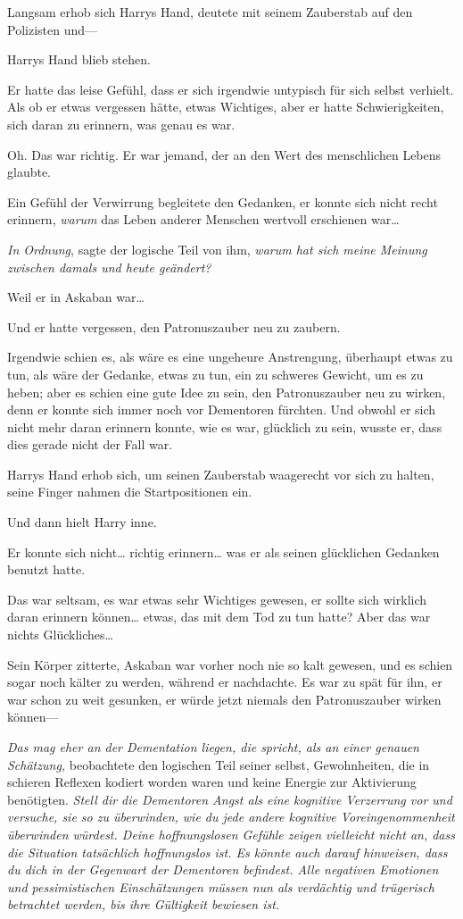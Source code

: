 {Langsam erhob sich Harrys Hand, deutete mit seinem Zauberstab auf den Polizisten und—

Harrys Hand blieb stehen.

Er hatte das leise Gefühl, dass er sich irgendwie untypisch für sich selbst verhielt. Als ob er etwas vergessen hätte, etwas Wichtiges, aber er hatte Schwierigkeiten, sich daran zu erinnern, was genau es war.

Oh. Das war richtig. Er war jemand, der an den Wert des menschlichen Lebens glaubte.

Ein Gefühl der Verwirrung begleitete den Gedanken, er konnte sich nicht recht erinnern, \emph{warum} das Leben anderer Menschen wertvoll erschienen war…

\emph{In Ordnung}, sagte der logische Teil von ihm, \emph{warum hat sich meine Meinung zwischen damals und heute geändert?}

Weil er in Askaban war…

Und er hatte vergessen, den Patronuszauber neu zu zaubern.

Irgendwie schien es, als wäre es eine ungeheure Anstrengung, überhaupt etwas zu tun, als wäre der Gedanke, etwas zu tun, ein zu schweres Gewicht, um es zu heben; aber es schien eine gute Idee zu sein, den Patronuszauber neu zu wirken, denn er konnte sich immer noch vor Dementoren fürchten. Und obwohl er sich nicht mehr daran erinnern konnte, wie es war, glücklich zu sein, wusste er, dass dies gerade nicht der Fall war.

Harrys Hand erhob sich, um seinen Zauberstab waagerecht vor sich zu halten, seine Finger nahmen die Startpositionen ein.

Und dann hielt Harry inne.

Er konnte sich nicht… richtig erinnern… was er als seinen glücklichen Gedanken benutzt hatte.

Das war seltsam, es war etwas sehr Wichtiges gewesen, er sollte sich wirklich daran erinnern können… etwas, das mit dem Tod zu tun hatte? Aber das war nichts Glückliches…

Sein Körper zitterte, Askaban war vorher noch nie so kalt gewesen, und es schien sogar noch kälter zu werden, während er nachdachte. Es war zu spät für ihn, er war schon zu weit gesunken, er würde jetzt niemals den Patronuszauber wirken können—

\emph{Das mag eher an der Dementation liegen, die spricht, als an einer genauen Schätzung,} beobachtete den logischen Teil seiner selbst, Gewohnheiten, die in schieren Reflexen kodiert worden waren und keine Energie zur Aktivierung benötigten. \emph{Stell dir die Dementoren Angst als eine kognitive Verzerrung vor und versuche, sie so zu überwinden, wie du jede andere kognitive Voreingenommenheit überwinden würdest. Deine hoffnungslosen Gefühle zeigen vielleicht nicht an, dass die Situation tatsächlich hoffnungslos ist. Es könnte auch darauf hinweisen, dass du dich in der Gegenwart der Dementoren befindest. Alle negativen Emotionen und pessimistischen Einschätzungen müssen nun als verdächtig und trügerisch betrachtet werden, bis ihre Gültigkeit bewiesen ist.}

}
